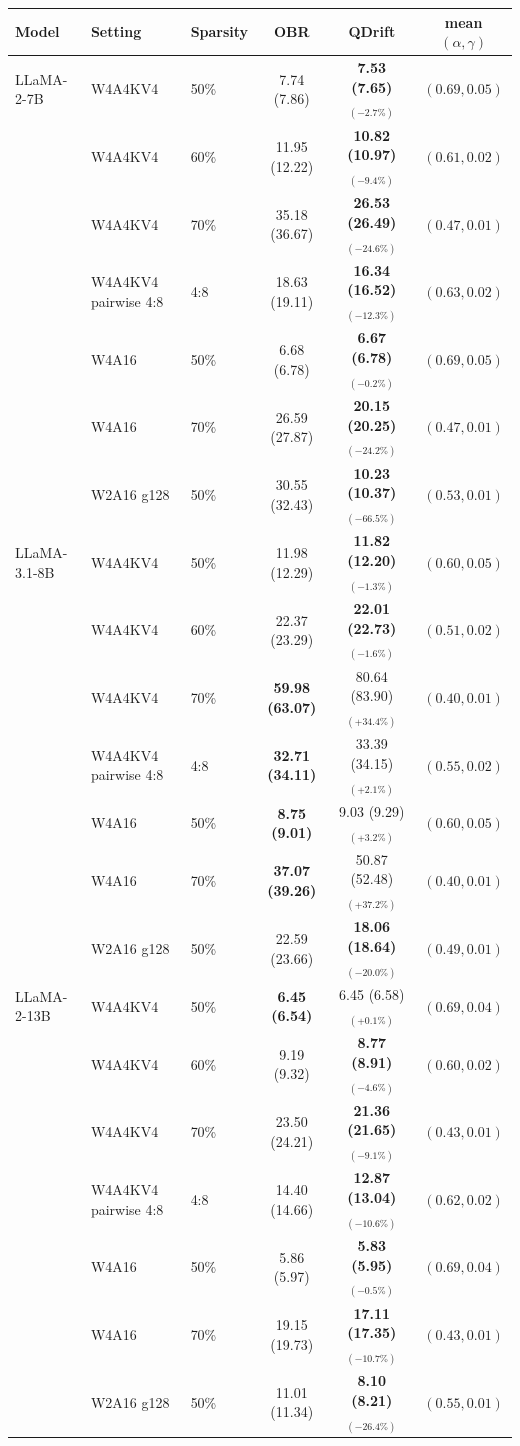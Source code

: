 \begin{tabular}{lllccc}
\toprule
Model & Setting & Sparsity & OBR & QDrift & mean $(\alpha,\gamma)$ \\
\midrule
LLaMA-2-7B & W4A4KV4 & 50\% & 7.74 (7.86) & \textbf{7.53 (7.65)}$_{(-2.7\%)}$ & $(0.69, 0.05)$ \\
 & W4A4KV4 & 60\% & 11.95 (12.22) & \textbf{10.82 (10.97)}$_{(-9.4\%)}$ & $(0.61, 0.02)$ \\
 & W4A4KV4 & 70\% & 35.18 (36.67) & \textbf{26.53 (26.49)}$_{(-24.6\%)}$ & $(0.47, 0.01)$ \\
 & W4A4KV4 pairwise 4:8 & 4:8 & 18.63 (19.11) & \textbf{16.34 (16.52)}$_{(-12.3\%)}$ & $(0.63, 0.02)$ \\
 & W4A16 & 50\% & 6.68 (6.78) & \textbf{6.67 (6.78)}$_{(-0.2\%)}$ & $(0.69, 0.05)$ \\
 & W4A16 & 70\% & 26.59 (27.87) & \textbf{20.15 (20.25)}$_{(-24.2\%)}$ & $(0.47, 0.01)$ \\
 & W2A16 g128 & 50\% & 30.55 (32.43) & \textbf{10.23 (10.37)}$_{(-66.5\%)}$ & $(0.53, 0.01)$ \\
\midrule
LLaMA-3.1-8B & W4A4KV4 & 50\% & 11.98 (12.29) & \textbf{11.82 (12.20)}$_{(-1.3\%)}$ & $(0.60, 0.05)$ \\
 & W4A4KV4 & 60\% & 22.37 (23.29) & \textbf{22.01 (22.73)}$_{(-1.6\%)}$ & $(0.51, 0.02)$ \\
 & W4A4KV4 & 70\% & \textbf{59.98 (63.07)} & 80.64 (83.90)$_{(+34.4\%)}$ & $(0.40, 0.01)$ \\
 & W4A4KV4 pairwise 4:8 & 4:8 & \textbf{32.71 (34.11)} & 33.39 (34.15)$_{(+2.1\%)}$ & $(0.55, 0.02)$ \\
 & W4A16 & 50\% & \textbf{8.75 (9.01)} & 9.03 (9.29)$_{(+3.2\%)}$ & $(0.60, 0.05)$ \\
 & W4A16 & 70\% & \textbf{37.07 (39.26)} & 50.87 (52.48)$_{(+37.2\%)}$ & $(0.40, 0.01)$ \\
 & W2A16 g128 & 50\% & 22.59 (23.66) & \textbf{18.06 (18.64)}$_{(-20.0\%)}$ & $(0.49, 0.01)$ \\
\midrule
LLaMA-2-13B & W4A4KV4 & 50\% & \textbf{6.45 (6.54)} & 6.45 (6.58)$_{(+0.1\%)}$ & $(0.69, 0.04)$ \\
 & W4A4KV4 & 60\% & 9.19 (9.32) & \textbf{8.77 (8.91)}$_{(-4.6\%)}$ & $(0.60, 0.02)$ \\
 & W4A4KV4 & 70\% & 23.50 (24.21) & \textbf{21.36 (21.65)}$_{(-9.1\%)}$ & $(0.43, 0.01)$ \\
 & W4A4KV4 pairwise 4:8 & 4:8 & 14.40 (14.66) & \textbf{12.87 (13.04)}$_{(-10.6\%)}$ & $(0.62, 0.02)$ \\
 & W4A16 & 50\% & 5.86 (5.97) & \textbf{5.83 (5.95)}$_{(-0.5\%)}$ & $(0.69, 0.04)$ \\
 & W4A16 & 70\% & 19.15 (19.73) & \textbf{17.11 (17.35)}$_{(-10.7\%)}$ & $(0.43, 0.01)$ \\
 & W2A16 g128 & 50\% & 11.01 (11.34) & \textbf{8.10 (8.21)}$_{(-26.4\%)}$ & $(0.55, 0.01)$ \\
\bottomrule
\end{tabular}
